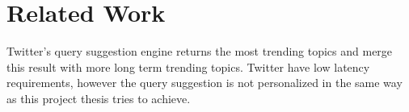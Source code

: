 \chapter{Related Work}
Twitter’s query suggestion engine returns the most trending topics and merge this result with more long term trending topics.
Twitter have low latency requirements, however the query suggestion is not personalized in the same way as this project thesis tries to achieve.
